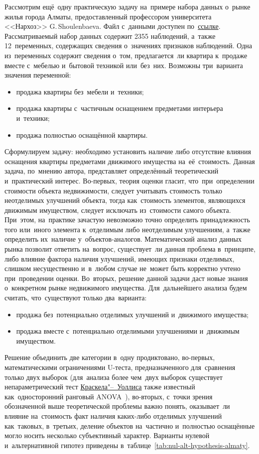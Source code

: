 \documentclass[]{scrartcl}
\begin{document}
Рассмотрим ещё~одну практическую задачу на~примере набора данных о~рынке жилья города Алматы, предоставленный профессором университета <<Нархоз>> G.\,Shoulenbaeva. Файл с~данными доступен по~\href{https://github.com/Kirill-Murashev/AI_for_valuers_book/blob/main/Parts-Chapters/Mann-Whitney-Wilcoxon/almaty-apts-2019-1.csv}{ссылке}\cite{ds:almaty-apts-2019-1}. Рассматриваемый набор данных содержит 2355 наблюдений, а~также 12~переменных, содержащих сведения о~значениях признаков наблюдений. Одна из~переменных содержит сведения о~том, предлагается~ли квартира к~продаже вместе с~мебелью и~бытовой техникой или~без~них. Возможны три~варианта значения переменной:
\begin{itemize}
	\item продажа квартиры без~мебели и~техники;
	\item продажа квартиры с~частичным оснащением предметами интерьера и~техники;
	\item продажа полностью оснащённой квартиры. 
\end{itemize}
Сформулируем задачу: необходимо установить наличие либо отсутствие влияния оснащения квартиры предметами движимого имущества на~её~стоимость. Данная задача, по~мнению автора, представляет определённый теоретический и~практический интерес. Во-первых, теория оценки гласит, что~при~определении стоимости объекта недвижимости, следует учитывать стоимость только неотделимых улучшений объекта, тогда как~стоимость элементов, являющихся движимым имуществом, следует исключать из~стоимости самого объекта. При~этом, на~практике зачастую невозможно точно определить принадлежность того или~иного элемента к~отделимым либо неотделимым улучшениям, а~также определить их~наличие у~объектов-аналогов. Математический анализ данных рынка позволит ответить на~вопрос, существует~ли данная проблема в~принципе, либо влияние фактора наличия улучшений, имеющих признаки отделимых, слишком несущественно и~в~любом случае не~может быть корректно учтено при~проведении оценки. Во~вторых, решение данной задачи даст новые знания о~конкретном рынке недвижимого имущества. Для~дальнейшего анализа будем считать, что~существуют только два~варианта:
\begin{itemize}
	\item продажа без~потенциально отделимых улучшений и~движимого имущества;
	\item продажа вместе с~потенциально отделимыми улучшениями и~движимым имуществом.
\end{itemize}
Решение объединить две категории в~одну продиктовано, во-первых, математическими ограничениями U-теста, предназначенного для~сравнения только двух выборок (для~анализа более чем~двух выборок существует непараметрический тест \href{https://en.wikipedia.org/wiki/Kruskal–Wallis_one-way_analysis_of_variance}{Краскела"--~Уоллиса} также известный как~односторонний ранговый ANOVA~\cite{Wiki:Kruskal-Wallis}), во-вторых, с~точки зрения обозначенной выше теоретической проблемы важно понять, оказывает~ли влияние на~стоимость факт наличия каких-либо отделимых улучшений как~таковых, в~третьих, деление объектов на~частично и~полностью оснащённые могло носить несколько субъективный характер. Варианты нулевой и~альтернативной гипотез приведены в~таблице~\ref{tab:nul-alt-hypothesis-almaty}.
\end{document}
